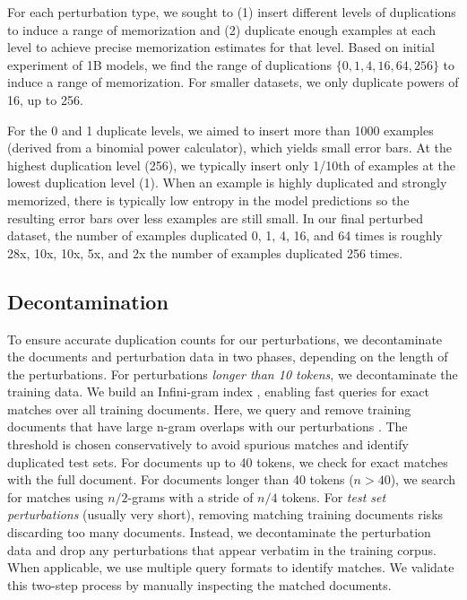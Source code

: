For each perturbation type, we sought to (1) insert different levels of duplications to induce a range of memorization and (2) duplicate enough examples at each level to achieve precise memorization estimates for that level. Based on initial experiment of 1B models, we find the range of duplications $\{0,1,4,16,64,256\}$ to induce a range of memorization. For smaller datasets, we only duplicate powers of 16, up to 256. 

For the 0 and 1 duplicate levels, we aimed to insert more than 1000 examples (derived from a binomial power calculator), which yields small error bars. At the highest duplication level (256), we typically insert only 1/10th of examples at the lowest duplication level (1). When an example is highly duplicated and strongly memorized, there is typically low entropy in the model predictions so the resulting error bars over less examples are still small. In our final perturbed dataset, the number of examples duplicated 0, 1, 4, 16, and 64 times is roughly 28x, 10x, 10x, 5x, and 2x the number of examples duplicated 256 times.





\subsection{Decontamination}
\label{app:decontamination}

To ensure accurate duplication counts for our perturbations, we decontaminate the documents and perturbation data in two phases, depending on the length of the perturbations. For perturbations \textit{longer than 10 tokens}, we decontaminate the training data. We build an Infini-gram index \citep{liu2024infinigram}, enabling fast queries for exact matches over all training documents. Here, we query and remove training documents that have large n-gram overlaps with our perturbations \citep[similar to][]{brown_2020_language}. The threshold is chosen conservatively to avoid spurious matches and identify duplicated test sets. For documents up to 40 tokens, we check for exact matches with the full document. For documents longer than 40 tokens ($n>40$), we search for matches using $n/2$-grams with a stride of $n/4$ tokens. For \textit{test set perturbations} (usually very short), removing matching training documents risks discarding too many documents. Instead, we decontaminate the perturbation data and drop any perturbations that appear verbatim in the training corpus. When applicable, we use multiple query formats to identify matches. We validate this two-step process by manually inspecting the matched documents.
